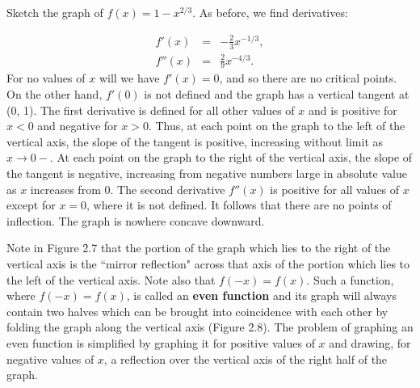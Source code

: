 \begin{example}
Sketch the graph of $f(x) = 1 - x^{2/3}$. As before, we find derivatives:

\begin{eqnarray*}
f'(x) &=& - \frac{2}{3}x^{-1/3},\\
f''(x) &=& \frac{2}{9} x^{-4/3}.
\end{eqnarray*}
\noindent For no values of $x$ will we have $f'(x) = 0$, and so there are no critical points. On the other hand, $f'(0)$ is not defined and the graph has a vertical tangent at (0, 1). The first derivative is defined for all other values of $x$ and is positive for $x < 0$ and negative for $x > 0$. Thus, at each point on the graph to the left of the vertical axis, the slope of the tangent is positive, increasing without limit as $x \rightarrow 0-$. At each point on the graph to the right of the vertical axis, the slope of the tangent is negative, increasing from negative numbers large in absolute value as $x$ increases from 0. The second derivative $f''(x)$ is positive for all values of $x$ except for $x = 0$, where it is not defined. It follows that there are no points of inflection. The graph is nowhere concave downward.  


Note in Figure \f{2.7} that the portion of the graph which lies to the right of the vertical axis is the ``mirror reflection" across that axis of the portion which lies to the left of the vertical axis. Note also that $f(-x) = f(x)$. Such a function, where $f(-x) = f(x)$, is called an \textbf{even function} and its graph will always contain two halves which can be brought into coincidence with each other by folding the graph along the vertical axis (Figure \f{2.8}). The problem of graphing an even function is simplified by graphing it for positive values of $x$ and drawing, for negative values of $x$, a reflection over the vertical axis of the right half of the graph.
\end{example}
\medskip

